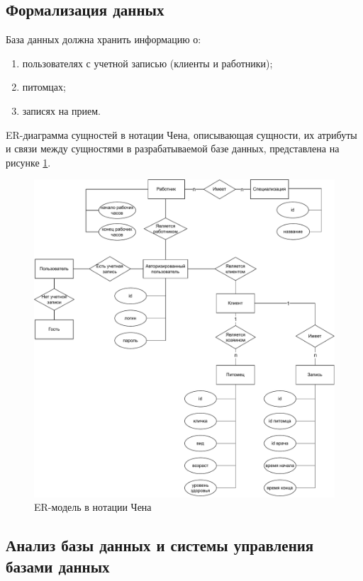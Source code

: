 \subsection{Формализация данных}

База данных должна хранить информацию о:
\begin{enumerate}[label*=---]
	\item пользователях с учетной записью (клиенты и работники);
	\item питомцах;
	\item записях на прием.
\end{enumerate}

ER-диаграмма сущностей в нотации Чена, описывающая сущности, их атрибуты и связи между сущностями в разрабатываемой базе данных, представлена на рисунке \ref{img:er}.

\begin{figure}[!h!]
	\centering
	\includegraphics[width=165mm]{image/er.pdf}
	\caption{ER-модель в нотации Чена}
	\label{img:er}
\end{figure}
\newpage

\subsection{Анализ базы данных и системы управления базами данных}

